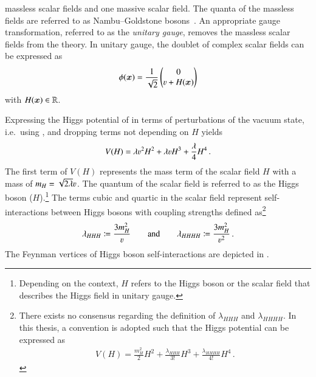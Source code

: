 massless scalar fields and one massive scalar field. The quanta of the massless
fields are referred to as Nambu--Goldstone
bosons~\cite{Nambu:1960tm,Goldstone:1961eq}. An appropriate gauge
transformation, referred to as the \emph{unitary gauge}, removes the massless
scalar fields from the theory. In unitary gauge, the doublet of complex scalar
fields can be expressed as
\begin{align}
  \phi(\myvec{x}) = \frac{1}{\sqrt{2}}
  \begin{pmatrix}
    0 \\
    \varv + H(\myvec{x})
  \end{pmatrix}
  \label{eq:vacuum_state_perturb}
\end{align}
with $H(\bm{x}) \in \mathbb{R}$.

Expressing the Higgs potential of  in terms of
perturbations of the vacuum state, i.e.\ using ,
and dropping terms not depending on $H$ yields
\begin{align}
  V(H) =
  \lambda \varv^2 H^2
  + \lambda \varv H^3
  + \frac{\lambda}{4} H^4 \,\text{.}
  \label{eq:beh_potential}
\end{align}
The first term of $V(H)$ represents the mass term of the scalar field $H$ with a
mass of $m_H = \sqrt{2\lambda} \varv$. The quantum of the scalar field is
referred to as the Higgs boson ($H$).\footnote{Depending on the context, $H$
  refers to the Higgs boson or the scalar field that describes the Higgs field
  in unitary gauge.} The terms cubic and quartic in the scalar field represent
self-interactions between Higgs bosons with coupling strengths defined
as\footnote{There exists no consensus regarding the definition of
  $\lambda_{HHH}$ and $\lambda_{HHHH}$. In this thesis, a convention is adopted
  such that the Higgs potential can be expressed as
  \begin{align*}
    V(H) = \frac{m_{H}^2}{2} H^2 + \frac{\lambda_{HHH}}{3!} H^3 + \frac{\lambda_{HHHH}}{4!}
    H^4 \,\text{.}
  \end{align*}
}
\begin{align*}
  \lambda_{HHH} \coloneqq \frac{3 m_{H}^2}{\varv} \qquad \text{and} \qquad \lambda_{HHHH} \coloneqq \frac{3 m_{H}^2}{\varv^2} \,\text{.}
\end{align*}
The Feynman vertices of Higgs boson self-interactions are depicted in
.

